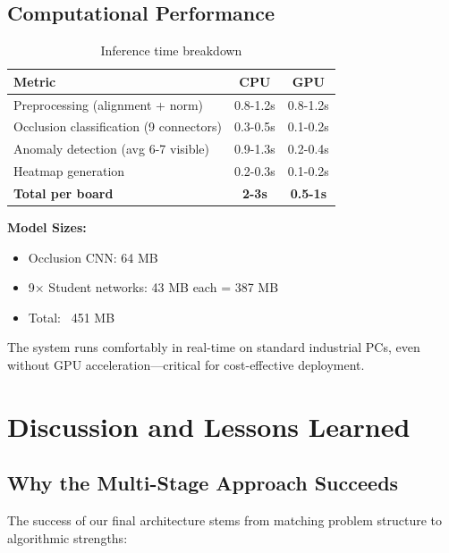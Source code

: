 \documentclass[11pt,a4paper,draft]{article}
\begin{document}
\subsection{Computational Performance}

\begin{table}[H]
\centering
\begin{tabular}{lcc}
\toprule
\textbf{Metric} & \textbf{CPU} & \textbf{GPU} \\
\midrule
Preprocessing (alignment + norm) & 0.8-1.2s & 0.8-1.2s \\
Occlusion classification (9 connectors) & 0.3-0.5s & 0.1-0.2s \\
Anomaly detection (avg 6-7 visible) & 0.9-1.3s & 0.2-0.4s \\
Heatmap generation & 0.2-0.3s & 0.1-0.2s \\
\midrule
\textbf{Total per board} & \textbf{2-3s} & \textbf{0.5-1s} \\
\bottomrule
\end{tabular}
\caption{Inference time breakdown}
\label{tab:timing}
\end{table}

\textbf{Model Sizes:}
\begin{itemize}
    \item Occlusion CNN: 64 MB
    \item 9× Student networks: 43 MB each = 387 MB
    \item Total: ~451 MB
\end{itemize}

The system runs comfortably in real-time on standard industrial PCs, even without GPU acceleration—critical for cost-effective deployment.

\section{Discussion and Lessons Learned}

\subsection{Why the Multi-Stage Approach Succeeds}

The success of our final architecture stems from matching problem structure to algorithmic strengths:
\end{document}
